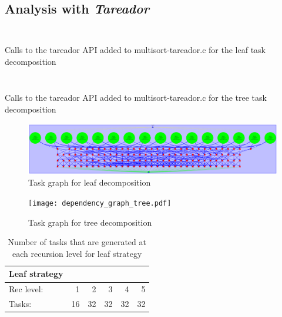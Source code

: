 \subsection{Analysis with \emph{Tareador}}

\begin{listing}[H]
\inputminted[firstline=20,lastline=31]{c}{sources/multisort-tareador-leaf.c}
\inputminted[firstline=33,lastline=51]{c}{sources/multisort-tareador-leaf.c}
\caption{Calls to the tareador API added to multisort-tareador.c for the leaf task decomposition}
\label{listing:tareador_leaf}
\end{listing}

\begin{listing}[H]
\inputminted[firstline=20,lastline=31]{c}{sources/multisort-tareador-tree.c}
\inputminted[firstline=33,lastline=51]{c}{sources/multisort-tareador-tree.c}
\caption{Calls to the tareador API added to multisort-tareador.c for the tree task decomposition}
\label{listing:tareador_leaf}
\end{listing}

\begin{figure}[H]
\centering
\includegraphics[width=\textwidth]{dependency_graph_leaf.pdf}
\caption{Task graph for leaf decomposition}
\label{fig:tar_tasks_leaf}
\end{figure}

\begin{figure}[H]
\centering
\texttt{[image: dependency\_graph\_tree.pdf]}
\caption{Task graph for tree decomposition}
\label{fig:tar_tasks_tree}
\end{figure}

\begin{table}[H]
\centering
\begin{tabular}{lrrrrr}
\toprule
Leaf strategy & & & & & \\
\midrule
Rec level:        & 1     & 2     & 3     & 4     & 5  \\
Tasks:    & 16    & 32    & 32    & 32    & 32 \\
\bottomrule
\end{tabular}

\caption{Number of tasks that are generated at each recursion level for leaf strategy} 
\label{tab:leaf_tasks-rec_level}
\end{table}

